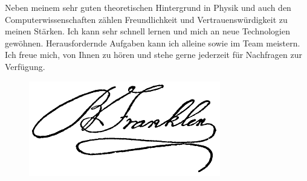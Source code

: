 \documentclass{article}%
\begin{document}
\begin{minipage}{\textwidth}
\newline%
Neben meinem sehr guten theoretischen Hintergrund in Physik und auch den Computerwissenschaften zählen Freundlichkeit und Vertrauenswürdigkeit zu meinen Stärken. Ich kann sehr schnell lernen und mich an neue Technologien gewöhnen. Herausfordernde Aufgaben kann ich alleine sowie im Team meistern.\newline%
Ich freue mich, von Ihnen zu hören und stehe gerne jederzeit für Nachfragen zur Verfügung.%
\vspace*{30mm}%
\end{minipage}%


\begin{figure}[ht]%
\raggedleft%
\includegraphics[width=0.2\linewidth]{signature.png}%
\end{figure}

%
\end{document}
